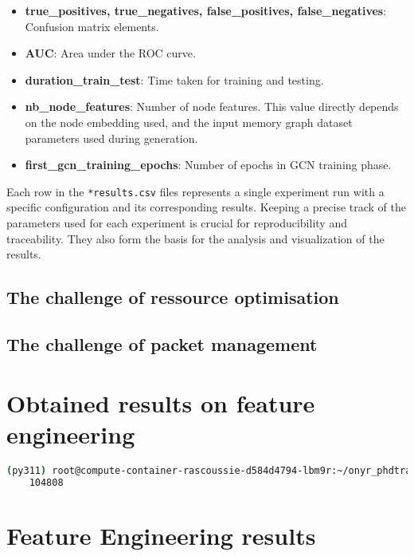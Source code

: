 \begin{itemize}
    \item \textbf{true\_positives, true\_negatives, false\_positives, false\_negatives}: Confusion matrix elements.
    \item \textbf{AUC}: Area under the ROC curve.
    \item \textbf{duration\_train\_test}: Time taken for training and testing.
    \item \textbf{nb\_node\_features}: Number of node features. This value directly depends on the node embedding used, and the input memory graph dataset parameters used during generation.
    \item \textbf{first\_gcn\_training\_epochs}: Number of epochs in GCN training phase.
\end{itemize}

Each row in the \texttt{*results.csv} files represents a single experiment run with a specific configuration and its corresponding results. Keeping a precise track of the parameters used for each experiment is crucial for reproducibility and traceability. They also form the basis for the analysis and visualization of the results.

\subsection{The challenge of ressource optimisation}

\subsection{The challenge of packet management}

\section{Obtained results on feature engineering}

\begin{lstlisting}[language=bash, caption={Command used to count the number of .gv memory graph files generated by \textit{mem2graph} inside one of the servers mem2graph dataset directory.}]
    (py311) root@compute-container-rascoussie-d584d4794-lbm9r:~/onyr_phdtrack/mem2graph# find data/ -type f -name "*.gv" | wc -l
    104808
\end{lstlisting}

\section{Feature Engineering results}

